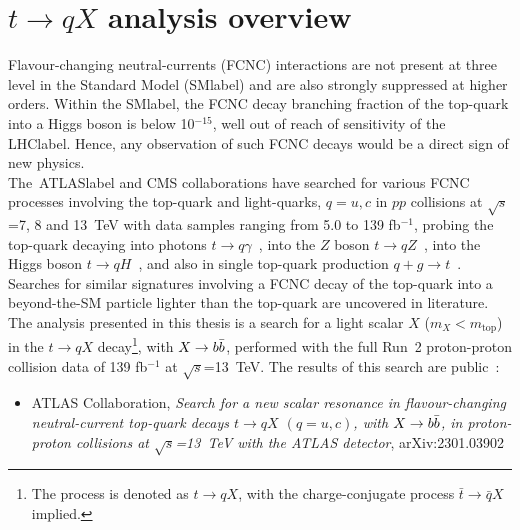\chapter{$t\to qX$ analysis overview}
\label{chapter:tqXanalysis}

Flavour-changing neutral-currents (FCNC) interactions are not present at three level in the Standard Model (\acrshort{SMlabel}) and are also strongly suppressed at higher orders. Within the \acrshort{SMlabel}, the FCNC decay branching fraction of the top-quark into a Higgs boson is below 10$^{-15}$, well out of reach of sensitivity of the \acrshort{LHClabel}. Hence, any observation of such FCNC decays would be a direct sign of new physics.\\

The~\acrshort{ATLASlabel} and CMS collaborations have searched for various FCNC processes involving the top-quark and light-quarks, $q=u,c$ in $pp$ collisions at $\sqrt{s}$=7, 8 and 13~TeV with data samples ranging from 5.0 to 139 fb$^{-1}$, probing the top-quark decaying into photons $t\to q\gamma$~\cite{ATLAStqgamma,tqgamma2020,CMStqgamma,Tumasyan_2022}, into the $Z$ boson $t\to qZ$~\cite{Sirunyan_2017,tqZ2018,ATLAS-CONF-2021-049,CMStqZ}, into the Higgs boson $t\to qH$~\cite{ATLAStqHtautau,TOPQ-2017-07,CMStqHRun2,Khachatryan_2017}, and also in single top-quark production $q+g\to t$~\cite{tqgluon2016,tqgluon2021,tqgluon2017CMS}. Searches for similar signatures involving a FCNC decay of the top-quark into a beyond-the-SM particle lighter than the top-quark are uncovered in literature.\\

The analysis presented in this thesis is a search for a light scalar $X$ ($m_X < m_\text{top}$) in the $t\to qX$ decay\footnote{The process is denoted as $t\to qX$, with the charge-conjugate process $\bar{t}\to\bar{q}X$ implied.}, with $X\to b\bar{b}$, performed with the full Run~2 proton-proton collision data of 139 fb$^{-1}$ at $\sqrt{s}$=13~TeV. The results of this search are public~\cite{ATLAS:2023mcc}:

\begin{itemize}
    \item ATLAS Collaboration, \textit{Search for a new scalar resonance in flavour-changing neutral-current top-quark decays $t\to qX$ $(q=u,c)$, with $X\to b\bar{b}$, in proton-proton collisions at $\sqrt{s}$=13~TeV with the ATLAS detector}, arXiv:2301.03902

\end{itemize}

